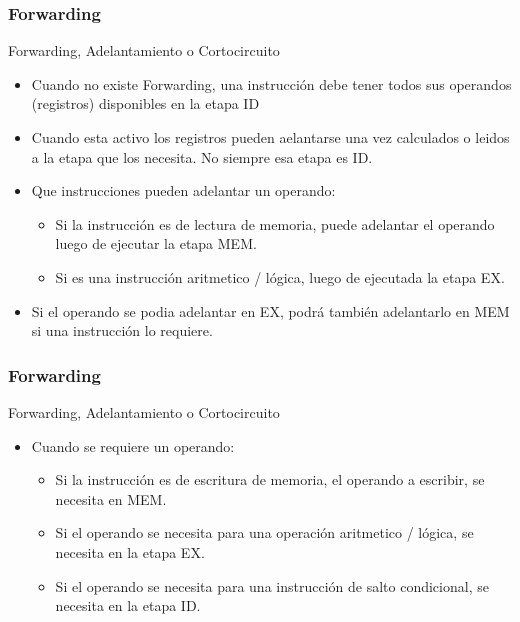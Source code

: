 \documentclass{beamer}
\begin{document}
\begin{frame}[fragile]
\frametitle{Forwarding}
Forwarding, Adelantamiento o Cortocircuito
\begin{itemize}
\item Cuando no existe Forwarding, una instrucción debe tener todos sus operandos (registros) disponibles en la etapa ID
\item Cuando esta activo los registros pueden aelantarse una vez calculados o leidos a la etapa que los necesita. No siempre esa etapa es ID.
\item Que instrucciones pueden adelantar un operando:
\begin{itemize}
\item Si la instrucción es de lectura de memoria, puede adelantar el operando luego de ejecutar la etapa MEM.
\item Si es una instrucción aritmetico / lógica, luego de ejecutada la etapa EX.
\end{itemize}
\item Si el operando se podia adelantar en EX, podrá también adelantarlo en MEM si una instrucción lo requiere.
\end{itemize}
\end{frame}

\begin{frame}[fragile]
\frametitle{Forwarding}
Forwarding, Adelantamiento o Cortocircuito
\begin{itemize}
\item Cuando se requiere un operando:
\begin{itemize}
\item Si la instrucción es de escritura de memoria, el operando a escribir, se necesita en MEM.
\item Si el operando se necesita para una operación aritmetico / lógica, se necesita en la etapa EX.
\item Si el operando se necesita para una instrucción de salto condicional, se necesita en la etapa ID.
\end{itemize}
\end{itemize}
\end{frame}
\end{document}
